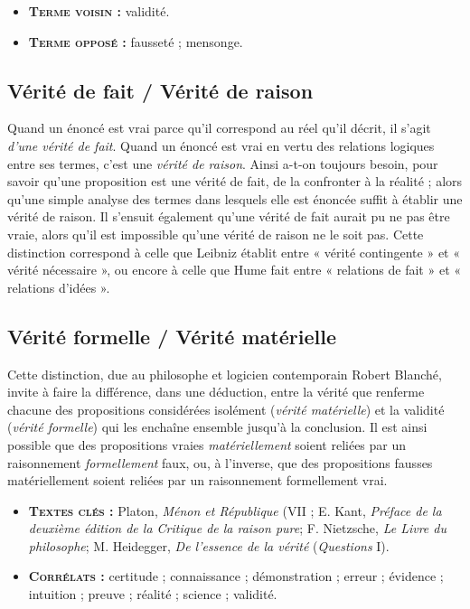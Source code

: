 \begin{itemize}[leftmargin=1cm, label=, itemsep=1pt]
\item {\bf \textsc{Terme voisin} :} validité.
\item {\bf \textsc{Terme opposé} :} fausseté ; mensonge.
\end{itemize}

\subsection{Vérité de fait / Vérité de raison}

Quand un énoncé est vrai parce qu'il
correspond au réel qu'il décrit, il s’agit
{\it d'une vérité de fait}. Quand un énoncé
est vrai en vertu des relations logiques
entre ses termes, c’est une {\it vérité de raison}.
Ainsi a-t-on toujours besoin, pour
savoir qu’une proposition est une vérité
de fait, de la confronter à la réalité ; alors
qu’une simple analyse des termes dans
lesquels elle est énoncée suffit à établir
une vérité de raison. Il s'ensuit également
qu'une vérité de fait aurait pu ne
pas être vraie, alors qu'il est impossible
qu'une vérité de raison ne le soit pas.
Cette distinction correspond à celle que
Leibniz établit entre « vérité contingente »
et « vérité nécessaire », ou encore
à celle que Hume fait entre « relations
de fait » et « relations d'idées ».

\subsection{Vérité formelle / Vérité matérielle}

Cette distinction, due au philosophe et
logicien contemporain Robert Blanché,
invite à faire la différence, dans une
déduction, entre la vérité que renferme
chacune des propositions considérées
isolément ({\it vérité matérielle}) et la validité
({\it vérité formelle}) qui les enchaîne
ensemble jusqu’à la conclusion. Il est
ainsi possible que des propositions
vraies {\it matériellement} soient reliées par
un raisonnement {\it formellement} faux, ou,
à l'inverse, que des propositions fausses
matériellement soient reliées par un raisonnement
formellement vrai.

\begin{itemize}[leftmargin=1cm, label=, itemsep=1pt]
\item {\bf \textsc{Textes clés} :} Platon, {\it Ménon et
République} (VII ; E. Kant, {\it Préface
de la deuxième édition de la Critique
de la raison pure}; F.
Nietzsche, {\it Le Livre du philosophe};
M. Heidegger, {\it De l'essence de la
vérité} ({\it Questions} I).
\item {\bf \textsc{Corrélats} :} certitude ; connaissance ;
démonstration ; erreur ; évidence ;
intuition ; preuve ; réalité ;
science ; validité.
\end{itemize}


